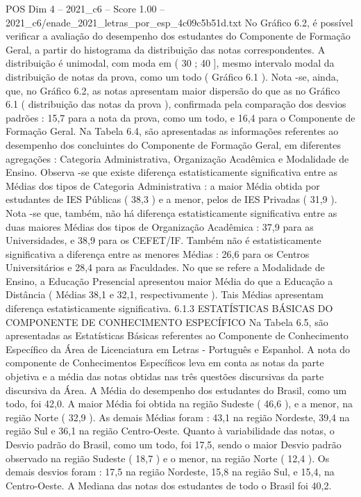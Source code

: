\begin{textsample}{POS Dim 4 – 2021\_c6 – Score 1.00 – 2021\_c6/enade\_2021\_letras\_por\_esp\_4c09c5b51d.txt}
No Gráfico 6.2, é possível verificar a avaliação do desempenho dos estudantes do Componente de Formação Geral, a partir do histograma da distribuição das notas correspondentes.
A distribuição é unimodal, com moda em ( 30 ; 40 ], mesmo intervalo modal da distribuição de notas da prova, como um todo ( Gráfico 6.1 ).
Nota -se, ainda, que, no Gráfico 6.2, as notas apresentam maior dispersão do que as no Gráfico 6.1 ( distribuição das notas da prova ), confirmada pela comparação dos desvios padrões : 15,7 para a nota da prova, como um todo, e 16,4 para o Componente de Formação Geral.
Na Tabela 6.4, são apresentadas as informações referentes ao desempenho dos concluintes do Componente de Formação Geral, em diferentes agregações : Categoria Administrativa, Organização Acadêmica e Modalidade de Ensino.
Observa -se que existe diferença estatisticamente significativa entre as Médias dos tipos de Categoria Administrativa : a maior Média obtida por estudantes de IES Públicas ( 38,3 ) e a menor, pelos de IES Privadas ( 31,9 ).
Nota -se que, também, não há diferença estatisticamente significativa entre as duas maiores Médias dos tipos de Organização Acadêmica : 37,9 para as Universidades, e 38,9 para os CEFET/IF.
Também não é estatisticamente significativa a diferença entre as menores Médias : 26,6 para os Centros Universitários e 28,4 para as Faculdades.
No que se refere a Modalidade de Ensino, a Educação Presencial apresentou maior Média do que a Educação a Distância ( Médias 38,1 e 32,1, respectivamente ).
Tais Médias apresentam diferença estatisticamente significativa. 6.1.3 ESTATÍSTICAS BÁSICAS DO COMPONENTE DE CONHECIMENTO ESPECÍFICO Na Tabela 6.5, são apresentadas as Estatísticas Básicas referentes ao Componente de Conhecimento Específico da Área de Licenciatura em Letras - Português e Espanhol.
A nota do componente de Conhecimentos Específicos leva em conta as notas da parte objetiva e a média das notas obtidas nas três questões discursivas da parte discursiva da Área.
A Média do desempenho dos estudantes do Brasil, como um todo, foi 42,0.
A maior Média foi obtida na região Sudeste ( 46,6 ), e a menor, na região Norte ( 32,9 ).
As demais Médias foram : 43,1 na região Nordeste, 39,4 na região Sul e 36,1 na região Centro-Oeste.
Quanto à variabilidade das notas, o Desvio padrão do Brasil, como um todo, foi 17,5, sendo o maior Desvio padrão observado na região Sudeste ( 18,7 ) e o menor, na região Norte ( 12,4 ).
Os demais desvios foram : 17,5 na região Nordeste, 15,8 na região Sul, e 15,4, na Centro-Oeste.
A Mediana das notas dos estudantes de todo o Brasil foi 40,2.

\end{textsample}
